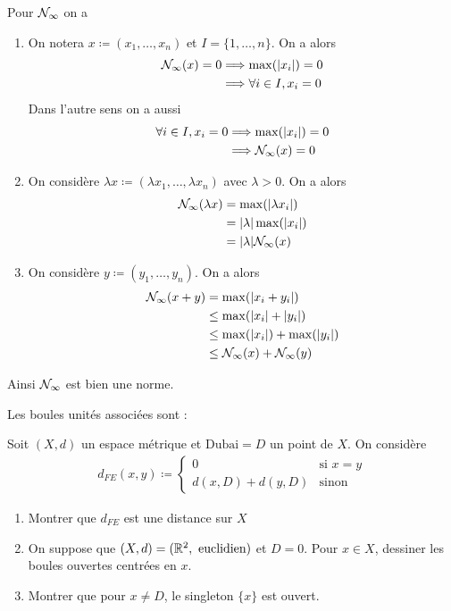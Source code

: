 \documentclass[french,a4paper,10pt]{article}
\begin{document}
\begin{td-sol}
		
		Pour $\mathcal{N}_\infty$ on a
		\begin{enumerate}[label=$(\roman*)$]
			\item On notera $x\coloneq(x_1,\dots,x_n)$ et $I=\{1,\dots,n\}$. On a alors
			\[\begin{aligned}
				\mathcal{N}_\infty(x)=0&\Longrightarrow\max(|x_i|) = 0\\
				&\Longrightarrow\forall i\in I,x_i=0
			\end{aligned}\] 
			Dans l'autre sens on a aussi
			\[\begin{aligned}
				\forall i\in I,x_i=0&\Longrightarrow \max(|x_i|) = 0\\
				&\Longrightarrow\mathcal{N}_\infty(x)=0
			\end{aligned}\] 
			\item On considère $\lambda x \coloneq(\lambda x_1,\dots,\lambda x_n)$ avec $\lambda>0$. On a alors
			\[\begin{aligned}
				\mathcal{N}_\infty (\lambda x)&=\max(|\lambda x_i|)\\
				&=|\lambda| \max(|x_i|)\\
				&=|\lambda| \mathcal{N}_\infty (x)
			\end{aligned}\]
			\item On considère $y\coloneq(y_1,\dots,y_n)$. On a alors
			\[\begin{aligned}
				\mathcal{N}_\infty (x+y)&=\max(|x_i + y_i|)\\
				&\le\max(|x_i| + |y_i|)\\
				&\le \max(|x_i|) + \max(|y_i|)\\
				&\le \mathcal{N}_\infty (x)+\mathcal{N}_\infty(y)
			\end{aligned}\]
		\end{enumerate}
		Ainsi $\mathcal{N}_\infty$ est bien une norme.
		
		Les boules unités associées sont : \\
		
		
	\end{td-sol}
	\medspace
	\begin{td-exo}
		Soit $(X, d)$ un espace métrique et $\text{Dubai}=D$ un point de $X$. On considère
		\[\begin{aligned}
			d_{FE}(x, y)\coloneq\begin{cases}
				0&\text{si }x=y\\
				d(x, D)+d(y, D)&\text{sinon}
			\end{cases}
		\end{aligned}\]
		
		\begin{enumerate}
			\item Montrer que $d_{FE}$ est une distance sur $X$
			\item On suppose que $(X, d)=(\mathbb{R}^2, \text{ euclidien})$ et $D=0$. Pour $x\in X$, dessiner les boules ouvertes centrées en $x$.
			\item Montrer que pour $x\ne D$, le singleton $\{x\}$ est ouvert.
		\end{enumerate}
	\end{td-exo}
\end{document}
